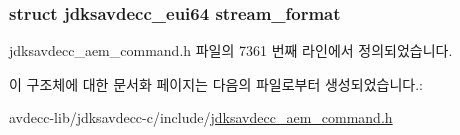 \subsubsection[{\texorpdfstring{stream\+\_\+format}{stream_format}}]{\setlength{\rightskip}{0pt plus 5cm}struct {\bf jdksavdecc\+\_\+eui64} stream\+\_\+format}\hypertarget{structjdksavdecc__aem__command__get__stream__format__response_a77359be54ea386b1da66597746709ed0}{}\label{structjdksavdecc__aem__command__get__stream__format__response_a77359be54ea386b1da66597746709ed0}


jdksavdecc\+\_\+aem\+\_\+command.\+h 파일의 7361 번째 라인에서 정의되었습니다.



이 구조체에 대한 문서화 페이지는 다음의 파일로부터 생성되었습니다.\+:\begin{DoxyCompactItemize}
\item 
avdecc-\/lib/jdksavdecc-\/c/include/\hyperlink{jdksavdecc__aem__command_8h}{jdksavdecc\+\_\+aem\+\_\+command.\+h}\end{DoxyCompactItemize}
